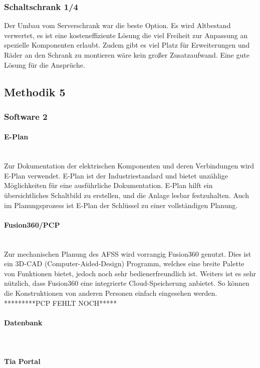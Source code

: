 \subsubsection{Schaltschrank 1/4}
Der Umbau vom Serverschrank war die beste Option. Es wird Altbestand verwertet, es ist eine kosteneffiziente Lösung die viel Freiheit zur Anpassung an spezielle Komponenten erlaubt. Zudem gibt es viel Platz für Erweiterungen und Räder an den Schrank zu montieren wäre kein großer Zusatzaufwand. 
Eine gute Lösung für die Ansprüche.

\subsection{Methodik 5}

\subsubsection{Software 2}
\paragraph{E-Plan}\mbox{}\\
Zur Dokumentation der elektrischen Komponenten und deren Verbindungen wird E-Plan verwendet. E-Plan ist der Industriestandard und bietet unzählige Möglichkeiten für eine ausführliche Dokumentation. E-Plan hilft ein übersichtliches Schaltbild zu erstellen, und die Anlage lesbar festzuhalten. Auch im Planungsprozess ist E-Plan der Schlüssel zu einer vollständigen Planung.
\paragraph{Fusion360/PCP}\mbox{}\\
Zur mechanischen Planung des AFSS wird vorrangig Fusion360 genutzt. Dies ist ein 3D-CAD (Computer-Aided-Design) Programm, welches eine breite Palette von Funktionen bietet, jedoch noch sehr bedienerfreundlich ist. Weiters ist es sehr nützlich, dass Fusion360 eine integrierte Cloud-Speicherung anbietet. So können die Konstruktionen von anderen Personen einfach eingesehen werden. *********PCP FEHLT NOCH*****
\paragraph{Datenbank}\mbox{}\\
\paragraph{Tia Portal}\mbox{}\\
